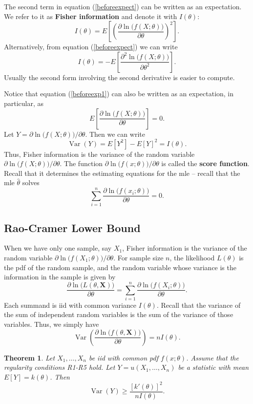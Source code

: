 \documentclass[12pt]{article}
\newcommand{\sumn}{\sum_{i=1}^n}
\newcommand{\thetahat}{\hat{\theta}}
\renewcommand{\vec}[1]{\mathbf{#1}}
\renewcommand{\hat}[1]{\widehat{#1}}
\DeclareMathOperator*{\Var}{Var}
\newtheorem{theorem}{Theorem}
\theoremstyle{definition}
\begin{document}
The second term in equation (\ref{beforeexpect}) can be written as an expectation. We refer to it as \textbf{Fisher information} and denote it with $I(\theta)$:
	\[ I(\theta) = E\left[    \left (\frac{\partial \ln\big( f(X;\theta)\big)}{\partial \theta }\right)^2 \right].	\]
Alternatively, from equation (\ref{beforeexpect}) we can write
	\[ I(\theta) = -E\left[  \frac{\partial^2 \ln\big( f(X;\theta)\big)}{\partial \theta^2 } \right]. 	\]
Usually the second form involving the second derivative is easier to compute. 

Notice that equation (\ref{beforeexp1}) can also be written as an expectation, in particular, as
	\[	
		E \left[  \frac{\partial \ln\big( f(X;\theta)\big)}{\partial \theta }\right] =0.
	\]
Let $Y =   \partial \ln\big( f(X;\theta)\big)/\partial \theta$. Then we can write
	\[	\Var(Y) = E[Y^2] - E[Y]^2  = I(\theta).\] 
Thus, Fisher information is the variance of the random variable $ \partial \ln\big( f(X;\theta)\big)/\partial \theta$. The function $\partial \ln\big( f(x;\theta)\big)/\partial \theta$ is called the \textbf{score function}. Recall that it determines the estimating equations for the mle -- recall that the mle $\thetahat$ solves
	\[\sumn  \frac{\partial \ln\big( f(x_i;\theta)\big)}{\partial \theta}=0.	\]




\subsection{Rao-Cramer Lower Bound} 

When we have only one sample, say $X_1$, Fisher information is the variance of the random variable $\partial \ln\big( f(X_1;\theta)\big)/\partial \theta$. For sample size $n$, the likelihood $L(\theta)$ is the pdf of the random sample, and the random variable whose variance is the information in the sample is given by
	\[	\frac{\partial \ln \big( L(\theta, \vec{X})\big)}{\partial \theta} = \sumn \frac{\partial \ln \big( f(X_i;\theta) \big)}{\partial \theta} .\]
Each summand is iid with common variance $I(\theta)$. Recall that the variance of the sum of independent random variables is the sum of the variance of those variables. Thus, we simply have
	\[ \Var\left( \frac{\partial \ln \big( f(\theta,\vec{X})\big)}{\partial \theta} \right) = nI(\theta). 	\]

\begin{theorem}
	Let $X_1, \hdots, X_n$ be iid with common pdf $f(x;\theta)$. Assume that the regularity conditions R1-R5 hold. Let $Y=u(X_1, \hdots, X_n)$ be a statistic with mean $E[Y]=k(\theta)$. Then
		\[	\Var(Y) \geq \frac{[k'(\theta)]^2}{nI(\theta)}.\]
\end{theorem}
\end{document}
